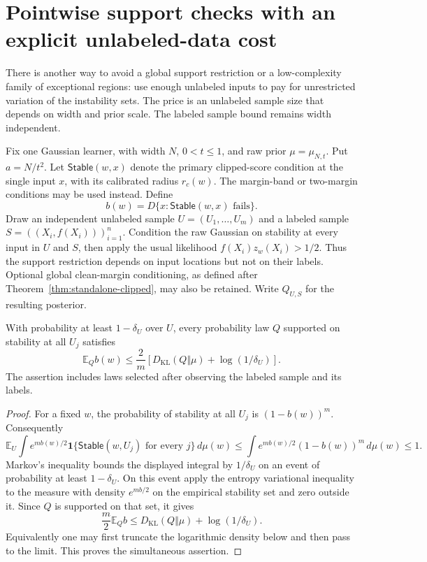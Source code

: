 \section{Pointwise support checks with an explicit unlabeled-data cost}
\label{sec:unlabeled-stability-pool}

There is another way to avoid a global support restriction or a
low-complexity family of exceptional regions: use enough unlabeled
inputs to pay for unrestricted variation of the instability sets.
The price is an unlabeled sample size that depends on width and prior
scale. The labeled sample bound remains width independent.

Fix one Gaussian learner, with width $N$, $0<t\le1$, and raw prior
$\mu=\mu_{N,t}$. Put $a=N/t^2$. Let $\mathsf{Stable}(w,x)$ denote
the primary clipped-score condition at the single input $x$, with
its calibrated radius $r_c(w)$. The margin-band or two-margin
conditions may be used instead. Define
\[
 b(w)=D\{x:\mathsf{Stable}(w,x)\text{ fails}\}.
\]
Draw an independent unlabeled sample $U=(U_1,\ldots,U_m)$ and a
labeled sample $S=((X_i,f(X_i)))_{i=1}^n$. Condition
the raw Gaussian on stability at every input in $U$ and $S$, then
apply the usual likelihood $f(X_i)z_w(X_i)>1/2$.
Thus the support restriction depends on input locations but not on
their labels. Optional global clean-margin conditioning, as defined
after Theorem~\ref{thm:standalone-clipped},
may also be retained. Write $Q_{U,S}$ for the resulting posterior.

\begin{lemma}
\label{lem:unlabeled-stability-pacbayes}
With probability at least $1-\delta_U$ over $U$, every probability
law $Q$ supported on stability at all $U_j$ satisfies
\[
 \mathbb E_Q b(w)
 \le \frac{2}{m}\left[D_{\mathrm{KL}}(Q\Vert\mu)
                       +\log(1/\delta_U)\right].
\]
The assertion includes laws selected after observing the labeled
sample and its labels.
\end{lemma}

\begin{proof}
For a fixed $w$, the probability of stability at all $U_j$ is
$(1-b(w))^m$. Consequently
\[
 \mathbb E_U\int
 e^{m b(w)/2}\mathbf1\{\mathsf{Stable}(w,U_j)\text{ for every }j\}
 \,d\mu(w)
 \le\int e^{m b(w)/2}(1-b(w))^m\,d\mu(w)\le1.
\]
Markov's inequality bounds the displayed integral by $1/\delta_U$
on an event of probability at least $1-\delta_U$. On this event apply
the entropy variational inequality to the measure with density
$e^{m b/2}$ on the empirical stability set and zero outside it.
Since $Q$ is supported on that set, it gives
\[
 \frac m2\mathbb E_Qb
 \le D_{\mathrm{KL}}(Q\Vert\mu)+\log(1/\delta_U).
\]
Equivalently one may first truncate the logarithmic density below
and then pass to the limit. This proves the simultaneous assertion.
\end{proof}


